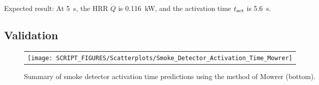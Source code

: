 \noindent Expected result: At 5~s, the HRR $\dot Q$ is 0.116~kW, and the activation time $t\sb{act}$ is 5.6~s.


\clearpage


\subsection*{Validation}

\begin{figure}[!ht]
\begin{center}
\begin{tabular}{l}
\texttt{[image: SCRIPT\_FIGURES/Scatterplots/Smoke\_Detector\_Activation\_Time\_Mowrer]}
\end{tabular}
\end{center}
\caption[Summary of smoke detector activation time predictions]
{Summary of smoke detector activation time predictions using the method of Mowrer (bottom).}
\label{Smoke_Detector_Activation_Summary_Mowrer}
\end{figure}